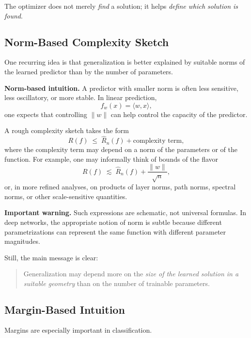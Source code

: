 \medskip

\noindent
The optimizer does not merely \emph{find} a solution; it helps \emph{define which solution is found}.

\subsection{Norm-Based Complexity Sketch}

One recurring idea is that generalization is better explained by suitable norms of the learned predictor than by the number of parameters.

\medskip

\noindent
\textbf{Norm-based intuition.}
A predictor with smaller norm is often less sensitive, less oscillatory, or more stable. In linear prediction,
\[
f_w(x)=\langle w,x\rangle,
\]
one expects that controlling \(\|w\|\) can help control the capacity of the predictor.

\medskip

\noindent
A rough complexity sketch takes the form
\[
R(f) \;\leq\; \hat{R}_n(f) + \text{complexity term},
\]
where the complexity term may depend on a norm of the parameters or of the function. For example, one may informally think of bounds of the flavor
\[
R(f) \;\lesssim\; \hat{R}_n(f) + \frac{\|w\|}{\sqrt{n}},
\]
or, in more refined analyses, on products of layer norms, path norms, spectral norms, or other scale-sensitive quantities.

\medskip

\noindent
\textbf{Important warning.}
Such expressions are schematic, not universal formulas. In deep networks, the appropriate notion of norm is subtle because different parametrizations can represent the same function with different parameter magnitudes.

\medskip

\noindent
Still, the main message is clear:

\begin{quote}
Generalization may depend more on the \emph{size of the learned solution in a suitable geometry} than on the number of trainable parameters.
\end{quote}

\subsection{Margin-Based Intuition}

Margins are especially important in classification.

